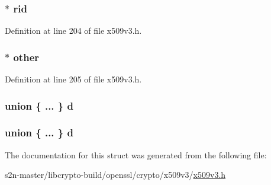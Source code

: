 \subsubsection[{\texorpdfstring{rid}{rid}}]{$\ast$ rid}\hypertarget{struct_g_e_n_e_r_a_l___n_a_m_e__st_aa9bbb5c9aaaedcb06be0da2c59b2e19d}{}\label{struct_g_e_n_e_r_a_l___n_a_m_e__st_aa9bbb5c9aaaedcb06be0da2c59b2e19d}


Definition at line 204 of file x509v3.\+h.

\subsubsection[{\texorpdfstring{other}{other}}]{$\ast$ other}\hypertarget{struct_g_e_n_e_r_a_l___n_a_m_e__st_a913b5f8be6ebbc8d847d25c9279ee3d2}{}\label{struct_g_e_n_e_r_a_l___n_a_m_e__st_a913b5f8be6ebbc8d847d25c9279ee3d2}


Definition at line 205 of file x509v3.\+h.

\subsubsection[{\texorpdfstring{d}{d}}]{\setlength{\rightskip}{0pt plus 5cm}union \{ ... \}   d}\hypertarget{struct_g_e_n_e_r_a_l___n_a_m_e__st_abe48e528f65cf9b6f7cedd8b2e2f90d0}{}\label{struct_g_e_n_e_r_a_l___n_a_m_e__st_abe48e528f65cf9b6f7cedd8b2e2f90d0}
\subsubsection[{\texorpdfstring{d}{d}}]{\setlength{\rightskip}{0pt plus 5cm}union \{ ... \}   d}\hypertarget{struct_g_e_n_e_r_a_l___n_a_m_e__st_a148cf70e1baaa2460ba0d7503e3abf88}{}\label{struct_g_e_n_e_r_a_l___n_a_m_e__st_a148cf70e1baaa2460ba0d7503e3abf88}


The documentation for this struct was generated from the following file\+:\begin{DoxyCompactItemize}
\item 
s2n-\/master/libcrypto-\/build/openssl/crypto/x509v3/\hyperlink{crypto_2x509v3_2x509v3_8h}{x509v3.\+h}\end{DoxyCompactItemize}
